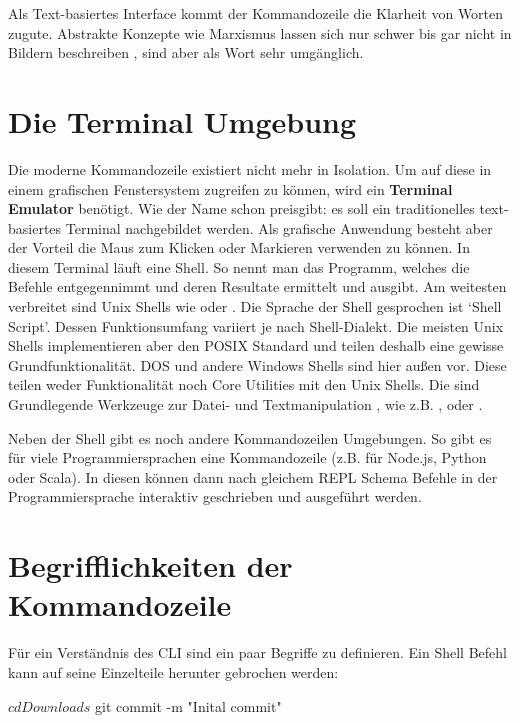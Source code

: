 \documentclass[oneside,bibliography=totocnumbered,BCOR=5mm]{scrbook}
\newenvironment{code}{\captionsetup{type=listing, skip=0pt}}{}
\begin{document}
Als Text-basiertes Interface kommt der Kommandozeile die Klarheit von Worten
zugute. Abstrakte Konzepte wie Marxismus lassen sich nur schwer bis gar nicht in
Bildern beschreiben \parencite{Raskin_2008}, sind aber als Wort sehr umgänglich.

\section{Die Terminal Umgebung}

Die moderne Kommandozeile existiert nicht mehr in Isolation. Um auf diese in
einem grafischen Fenstersystem zugreifen zu können, wird ein \textbf{Terminal
Emulator} benötigt. Wie der Name schon preisgibt: es soll ein traditionelles
text-basiertes Terminal nachgebildet werden. Als grafische Anwendung besteht
aber der Vorteil die Maus zum Klicken oder Markieren verwenden zu können. In
diesem Terminal läuft eine Shell. So nennt man das Programm, welches die Befehle
entgegennimmt und deren Resultate ermittelt und ausgibt. Am weitesten verbreitet
sind Unix Shells wie  oder .
Die Sprache der Shell gesprochen ist `Shell Script'. Dessen Funktionsumfang
variiert je nach Shell-Dialekt. Die meisten Unix Shells implementieren aber den
POSIX Standard und teilen deshalb eine gewisse Grundfunktionalität. DOS und
andere Windows Shells sind hier außen vor. Diese teilen weder Funktionalität
noch Core Utilities mit den Unix Shells. Die  sind
Grundlegende Werkzeuge zur Datei- und Textmanipulation \parencite{coreutils},
wie z.B. ,  oder .


Neben der Shell gibt es noch andere Kommandozeilen Umgebungen. So gibt es
für viele Programmiersprachen eine Kommandozeile (z.B. für Node.js, Python
oder Scala). In diesen können dann nach gleichem REPL Schema Befehle in der
Programmiersprache interaktiv geschrieben und ausgeführt werden.

\section{Begrifflichkeiten der Kommandozeile}

Für ein Verständnis des CLI sind ein paar Begriffe zu definieren. Ein Shell
Befehl kann auf seine Einzelteile herunter gebrochen werden:

\begin{code}
  \begin{shellcode}
$ cd Downloads
$ git commit -m "Inital commit"
  \end{shellcode}
\end{code}
\end{document}
